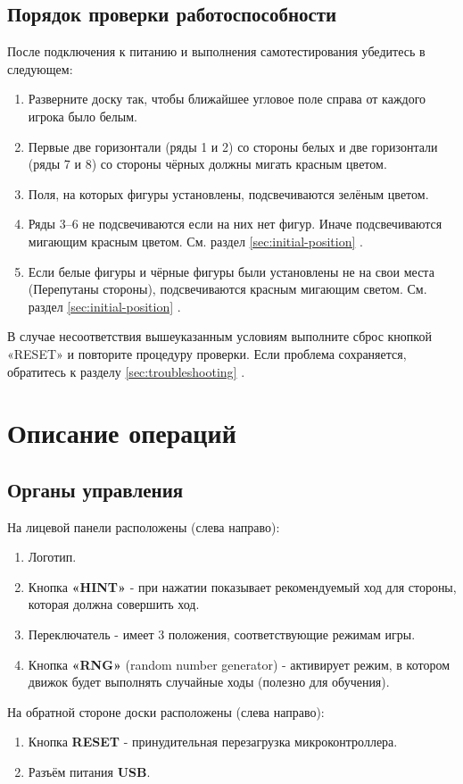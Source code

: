 \documentclass[a4paper,12pt]{article}
\begin{document}
\subsection{Порядок проверки работоспособности}
После подключения к питанию и выполнения самотестирования убедитесь в следующем:
\begin{enumerate}
    \item Разверните доску так, чтобы ближайшее угловое поле справа от каждого игрока было белым.
    \item Первые две горизонтали (ряды 1 и 2) со стороны белых и две горизонтали (ряды 7 и 8) со стороны чёрных должны мигать красным цветом.
    \item Поля, на которых фигуры установлены, подсвечиваются зелёным цветом.
    \item Ряды 3–6 не подсвечиваются если на них нет фигур. Иначе подсвечиваются мигающим красным цветом. См. раздел \ref{sec:initial-position} .
    \item Если белые фигуры и чёрные фигуры были установлены не на свои места (Перепутаны стороны), подсвечиваются красным мигающим светом. См. раздел \ref{sec:initial-position} .
\end{enumerate}
В случае несоответствия вышеуказанным условиям выполните сброс кнопкой «RESET» и повторите процедуру проверки.
Если проблема сохраняется, обратитесь к разделу \ref{sec:troubleshooting} .


\section{Описание операций}
\label{sec:operations}

\subsection{Органы управления}
На лицевой панели расположены (слева направо):
\begin{enumerate}
    \item Логотип.
    \item Кнопка \textbf{«HINT»} - при нажатии показывает рекомендуемый ход для стороны, которая должна совершить ход.
    \item Переключатель - имеет 3 положения, соответствующие режимам игры.
    \item Кнопка \textbf{«RNG»} (random number generator) - активирует режим, в котором движок будет выполнять случайные ходы (полезно для обучения).
\end{enumerate}
На обратной стороне доски расположены (слева направо):
\begin{enumerate}
    \item Кнопка \textbf{RESET} - принудительная перезагрузка микроконтроллера.
    \item Разъём питания \textbf{USB}.
\end{enumerate}
\end{document}
